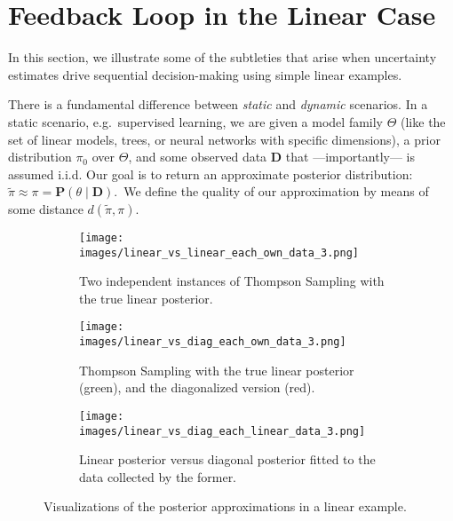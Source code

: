 \documentclass{article} \usepackage{iclr2018_conference,times}
\begin{document}
 \section{Feedback Loop in the Linear Case}\label{s:linear}
In this section, we illustrate some of the subtleties that arise when uncertainty estimates drive sequential decision-making using simple linear examples.


There is a fundamental difference between \emph{static} and \emph{dynamic} scenarios.
In a static scenario, e.g.\ supervised learning, we are given a model family $\Theta$ (like the set of linear models, trees, or neural networks with specific dimensions), a prior distribution $\pi_0$ over $\Theta$, and some observed data $\mathbf{D}$ that ---importantly--- is assumed i.i.d.
Our goal is to return an approximate posterior distribution: $\tilde{\pi} \approx \pi = \mathbf{P}(\theta \mid \mathbf{D})$.\,
We define the quality of our approximation by means of some distance $d(\tilde{\pi}, \pi)$.

\begin{figure}[t]
\begin{subfigure}[c]{0.95\textwidth}\texttt{[image: images/linear\_vs\_linear\_each\_own\_data\_3.png]}
  \caption{Two independent instances of Thompson Sampling with the true linear posterior.}
  \label{fig:lin1a}
\end{subfigure}
\begin{subfigure}[c]{0.95\textwidth}\texttt{[image: images/linear\_vs\_diag\_each\_own\_data\_3.png]}
  \caption{Thompson Sampling with the true linear posterior (green), and the diagonalized version (red).}
  \label{fig:lin1b}
\end{subfigure}
\begin{subfigure}[c]{0.95\textwidth}\texttt{[image: images/linear\_vs\_diag\_each\_linear\_data\_3.png]}
  \caption{Linear posterior versus diagonal posterior fitted to the data collected by the former.}
  \label{fig:lin1c}
\end{subfigure}
\caption{Visualizations of the posterior approximations in a linear example.}
\label{fig:lin1}
\end{figure}
\end{document}
